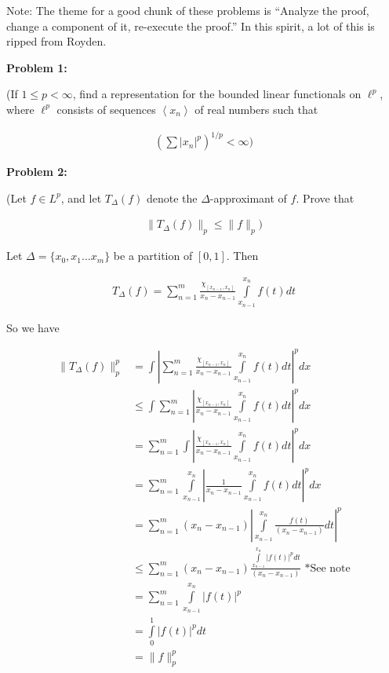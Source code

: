 \documentclass[a4paper,12pt]{article}
\newcommand{\shunt}{\vspace{20mm}}
\newcommand{\absval}[1]{\left\lvert #1 \right\rvert}
\newcommand{\norm}[1]{\|#1\|}
\newcommand{\anbrack}[1]{\left\langle #1 \right\rangle}
\newcommand{\De}{\Delta}
\begin{document}
Note: The theme for a good chunk of these problems is ``Analyze the proof, change a component of it, re-execute the proof.'' In this spirit, a lot of this is ripped from Royden.

{\bf Problem 1:} %

(If $1 \leq p < \infty$, find a representation for the bounded linear functionals on $\ell^p$, where $\ell^p$ consists of sequences $\anbrack{x_n}$ of real numbers such that

\begin{align*}
(\sum\absval{x_n}^p)^{1/p}<\infty ) 
\end{align*}

\shunt

{\bf Problem 2:} 

(Let $f \in L^p$, and let $T_\De(f)$ denote the $\De$-approximant of $f$. Prove that

\begin{align*}
\norm{T_\De(f)}_p \leq \norm{f}_p)
\end{align*}

Let $\De = \{x_0,x_1 \ldots x_m\}$ be a partition of $[0,1]$. Then 

\begin{align*}
T_\De(f) = \sum\limits_{n=1}^{m} \frac{\chi_{[x_{n-1},x_n]}}{x_n-x_{n-1}}\int\limits_{x_{n-1}}^{x_n} f(t)dt
\end{align*} 

So we have %

\begin{align*}
\norm{T_\De(f)}_p^p &= \int \absval{\sum\limits_{n=1}^{m} \frac{\chi_{[x_{n-1},x_n]}}{x_n-x_{n-1}}\int\limits_{x_{n-1}}^{x_n} f(t)dt}^pdx\\
&\leq \int \sum\limits_{n=1}^{m} \absval{ \frac{\chi_{[x_{n-1},x_n]}}{x_n-x_{n-1}}\int\limits_{x_{n-1}}^{x_n} f(t)dt}^pdx\\
&= \sum\limits_{n=1}^{m}\int  \absval{ \frac{\chi_{[x_{n-1},x_n]}}{x_n-x_{n-1}}\int\limits_{x_{n-1}}^{x_n} f(t)dt}^pdx\\
&= \sum\limits_{n=1}^{m}\int\limits_{x_{n-1}}^{x_n}  \absval{ \frac{1}{x_n-x_{n-1}}\int\limits_{x_{n-1}}^{x_n} f(t)dt}^pdx\\
&= \sum\limits_{n=1}^{m} (x_n-x_{n-1})\absval{ \int\limits_{x_{n-1}}^{x_n} \frac{f(t)}{(x_n-x_{n-1})}dt}^p\\
&\leq \sum\limits_{n=1}^{m} (x_n-x_{n-1})  \frac{\int\limits_{x_{n-1}}^{x_n}\absval{f(t)}^p dt}{(x_n-x_{n-1})} \text{ *See note}\\
&= \sum\limits_{n=1}^{m} \int\limits_{x_{n-1}}^{x_n}\absval{f(t)}^p \\
&= \int\limits_0^1 \absval{f(t)}^p dt \\
&= \norm{f}_p^p
\end{align*}
\end{document}

